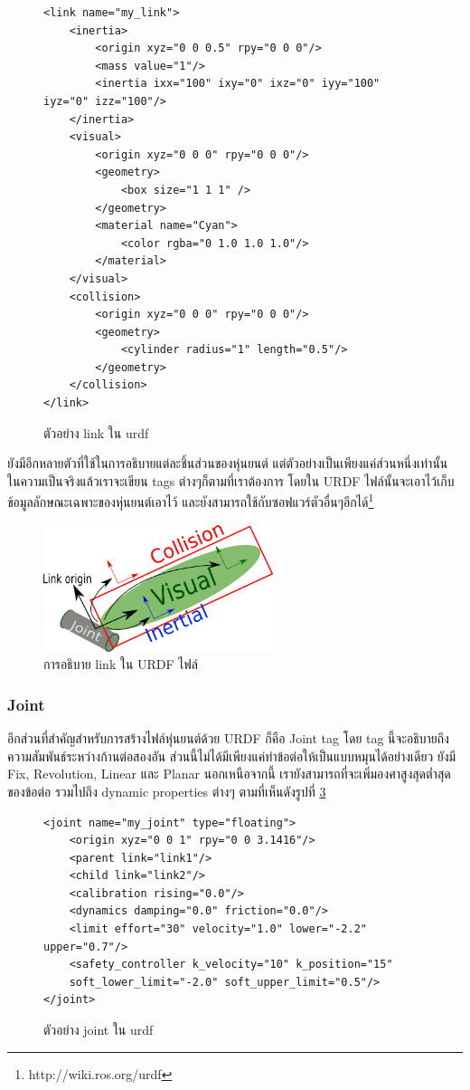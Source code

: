 \clearpage
\begin{figure}[!ht]
\begin{Verbatim}[fontsize=\small]
<link name="my_link">
    <inertia>
        <origin xyz="0 0 0.5" rpy="0 0 0"/>
        <mass value="1"/>
        <inertia ixx="100" ixy="0" ixz="0" iyy="100" iyz="0" izz="100"/>
    </inertia>
    <visual>
        <origin xyz="0 0 0" rpy="0 0 0"/>
        <geometry>
            <box size="1 1 1" />
        </geometry>
        <material name="Cyan">
            <color rgba="0 1.0 1.0 1.0"/>
        </material>
    </visual>
    <collision>
        <origin xyz="0 0 0" rpy="0 0 0"/>
        <geometry>
            <cylinder radius="1" length="0.5"/>
        </geometry>
    </collision>
</link>
\end{Verbatim}
\caption{ตัวอย่าง link ใน urdf}
\label{fig:urdf_link_code}
\end{figure}

ยังมีอีกหลายตัวที่ใช้ในการอธิบายแต่ละชิ้นส่วนของหุ่นยนต์ แต่ตัวอย่างเป็นเพียงแค่ส่วนหนึ่งเท่านั้น
ในความเป็นจริงแล้วเราจะเขียน tags ต่างๆก็ตามที่เราต้องการ โดยใน URDF ไฟล์นั้นจะเอาไว้เก็บข้อมูลลักษณะเฉพาะของหุ่นยนต์เอาไว้
และยังสามารถใช้กับซอฟแวร์ตัวอื่นๆอีกได้\footnote{http://wiki.ros.org/urdf}
\begin{figure}[!ht]
	\centering
	\includegraphics[width=0.60\textwidth]{chapter3/images/urdf_link.png}
	\caption{การอธิบาย link ใน URDF ไฟล์}
	\label{fig:urdf_link}
\end{figure}

\clearpage
\subsubsection*{Joint}
อีกส่วนที่สำคัญสำหรับการสร้างไฟล์หุ่นยนต์ด้วย URDF ก็คือ Joint tag โดย tag นี้จะอธิบายถึงความสัมพันธ์ระหว่างก้านต่อสองอัน
ส่วนนี้ไม่ได้มีเพียงแค่ทำข้อต่อให้เป็นแบบหมุนได้อย่างเดียว ยังมี Fix, Revolution, Linear และ Planar นอกเหนือจากนี้
เรายังสามารถที่จะเพิ่มองศาสูงสุดต่ำสุดของข้อต่อ รวมไปถึง dynamic properties ต่างๆ ตามที่เห็นดังรูปที่ \ref{fig:urdf_joint_code}
\begin{figure}[!ht]
\begin{Verbatim}[fontsize=\small]
<joint name="my_joint" type="floating">
	<origin xyz="0 0 1" rpy="0 0 3.1416"/>
	<parent link="link1"/>
	<child link="link2"/>
	<calibration rising="0.0"/>
	<dynamics damping="0.0" friction="0.0"/>
	<limit effort="30" velocity="1.0" lower="-2.2" upper="0.7"/>
	<safety_controller k_velocity="10" k_position="15" 
	soft_lower_limit="-2.0" soft_upper_limit="0.5"/>
</joint>
\end{Verbatim}
\caption{ตัวอย่าง joint ใน urdf}
	\label{fig:urdf_joint_code}
\end{figure}

